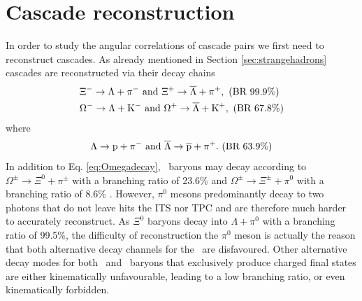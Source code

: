 
\section{Cascade reconstruction}
  In order to study the angular correlations of cascade pairs we first need to reconstruct cascades. As already mentioned in Section \ref{sec:strangehadrons} cascades are reconstructed via their decay chains \cite{PDG2024}
  \begin{align}
    & \Xi^- \rightarrow \Lambda + \pi^- \text{ and } \Xi^+ \rightarrow \overline{\Lambda} + \pi^+, \text{ (BR  99.9\%)} \label{eq:Xidecay} \\
    & \Omega^- \rightarrow \Lambda + \K^- \text{ and } \Omega^+ \rightarrow \overline{\Lambda} + \K^+, \text{ (BR  67.8\%)} \label{eq:Omegadecay}
  \end{align}
  where
  \begin{align}
    \Lambda \rightarrow \p + \pi^- \text{ and } \overline{\Lambda} \rightarrow \overline{\p} + \pi^+. \text{ (BR  63.9\%)} \label{eq:Lambdadecay} 
  \end{align}
  In addition to Eq. \ref{eq:Omegadecay}, \Omega\ baryons may decay according to $\Omega^\pm \rightarrow \Xi^0 + \pi^\pm$ with a branching ratio of 23.6\% and $\Omega^\pm \rightarrow \Xi^\pm + \pi^0$ with a branching ratio of 8.6\% . However, $\pi^0$ mesons predominantly decay to two photons that do not leave hits the ITS nor TPC and are therefore much harder to accurately reconstruct. As $\Xi^0$ baryons decay into $\Lambda + \pi^0$ with a branching ratio of 99.5\%, the difficulty of reconstruction the $\pi^0$ meson is actually the reason that both alternative decay channels for the \Omega\ are disfavoured. Other alternative decay modes for both \Xi\ and \Omega\ baryons that exclusively produce charged final states are either kinematically unfavourable, leading to a low branching ratio, or even kinematically forbidden. 

